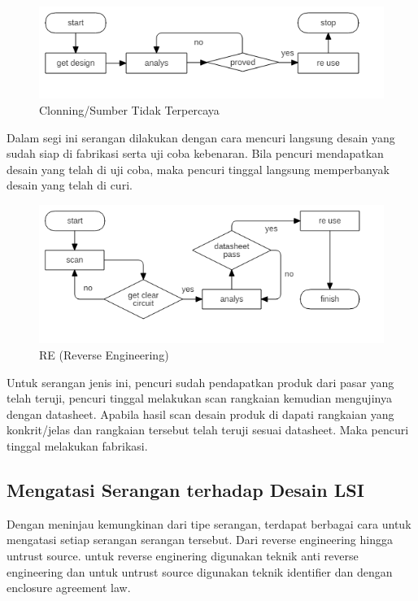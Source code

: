 \begin{figure}
	\centering
	\includegraphics[width=1.05\textwidth]
	{diagrams/untrustSource.png}
	\caption{Clonning/Sumber Tidak Terpercaya}
	\label{fig:untrustsource}
\end{figure}

Dalam segi ini serangan dilakukan dengan cara mencuri langsung desain yang sudah siap di fabrikasi serta uji coba kebenaran. Bila pencuri mendapatkan desain yang telah di uji coba, maka pencuri tinggal langsung memperbanyak desain yang telah di curi.

\begin{figure}
	\centering
	\includegraphics[width=1.05\textwidth]
	{diagrams/reverseEngineering.png}
	\caption{RE (Reverse Engineering)}
	\label{fig:reverseengineering}
\end{figure}

Untuk serangan jenis ini, pencuri sudah pendapatkan produk dari pasar yang telah teruji, pencuri tinggal melakukan scan rangkaian kemudian mengujinya dengan datasheet. Apabila hasil scan desain produk di dapati rangkaian yang konkrit/jelas dan rangkaian tersebut telah teruji sesuai datasheet. Maka pencuri tinggal melakukan fabrikasi.

\subsection{Mengatasi Serangan terhadap Desain LSI}
Dengan meninjau kemungkinan dari tipe serangan, terdapat berbagai cara untuk mengatasi setiap serangan serangan tersebut. Dari reverse engineering hingga untrust source. untuk reverse enginering digunakan teknik anti reverse engineering dan untuk untrust source digunakan teknik identifier dan dengan enclosure agreement law.

